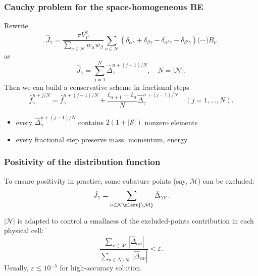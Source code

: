 \documentclass[mathserif]{beamer} %
\newcommand{\Nu}{\mathcal{N}}
\begin{document}
\begin{frame}
    \frametitle{Cauchy problem for the space-homogeneous BE}
    Rewrite
    \begin{equation}
        \hat{J}_\gamma = \frac{\pi V_\Gamma^2}{\sum_{\nu\in\Nu} w_{\alpha}w_{\beta}}
        \sum_{\nu\in\Nu} \left(
            \delta_{\alpha\gamma} + \delta_{\beta\gamma} -
            \delta_{\alpha'\gamma} - \delta_{\beta'\gamma}
        \right)\big(\cdots\big)B_\nu
    \end{equation}
    as
    \begin{equation}
        \hat{J}_{\gamma} = \sum_{j=1}^N \hat{\Delta}_{\gamma}^{n+(j-1)/N}, \quad N=|\Nu|.
    \end{equation}
    Then we can build a conservative scheme in fractional steps
    \begin{equation}\label{eq:fractional_step_scheme}
        \hat{f}_\gamma^{n+j/N} = \hat{f}_\gamma^{n+(j-1)/N} + \frac{t_{n+1}-t_n}{N}\hat{\Delta}_{\gamma}^{n+(j-1)/N}
        \quad (j = 1,\dotsc,N).
    \end{equation}
    \begin{itemize}
        \item every \(\hat{\Delta}_{\gamma}^{n+(j-1)/N}\) contains \(2(1+|\mathcal{S}|)\) nonzero elements
        \item every fractional step preserve mass, momentum, energy
    \end{itemize}
\end{frame}

\begin{frame}
    \frametitle{Positivity of the distribution function}
    To ensure positivity in practice, some cubature points (say, \(\mathcal{M}\)) can be excluded:
    \begin{equation}\label{eq:discrete_short_ci_discarded}
        \hat{J}_\gamma = \sum_{\nu\in\Nu\alert{\setminus\mathcal{M}}} \hat{\Delta}_{\gamma\nu}.
    \end{equation}
    \vspace{10pt}

    \(|\Nu|\) is adapted to control a smallness of the excluded-points contribution in each physical cell:
    \begin{equation}\label{eq:excluded_contribution}
        \frac{\sum_{\nu\in\mathcal{M}} \left| \hat{\Delta}_{\alpha\nu} \right|}
            {\sum_{\nu\in\Nu\setminus\mathcal{M}} \left| \hat{\Delta}_{\alpha\nu} \right|} < \varepsilon.
    \end{equation}
    Usually, \(\varepsilon \lesssim 10^{-5}\) for high-accuracy solution.
\end{frame}
\end{document}
